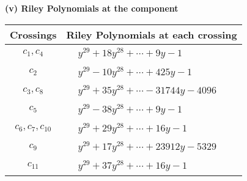 \documentclass[1p]{elsarticle_modified}
\theoremstyle{definition}
\begin{document}
\newpage\renewcommand{\arraystretch}{1}
\flushleft \textbf{(v) Riley Polynomials at the component}\newline \\
\begin{tabular}{m{50pt}|m{274pt}}
Crossings & \hspace{64pt}Riley Polynomials at each crossing \\
\hline $$\begin{aligned}c_{1},c_{4}\end{aligned}$$&$\begin{aligned}
&y^{29}+18 y^{28}+\cdots+9 y-1
\end{aligned}$\\
\hline $$\begin{aligned}c_{2}\end{aligned}$$&$\begin{aligned}
&y^{29}-10 y^{28}+\cdots+425 y-1
\end{aligned}$\\
\hline $$\begin{aligned}c_{3},c_{8}\end{aligned}$$&$\begin{aligned}
&y^{29}+35 y^{28}+\cdots-31744 y-4096
\end{aligned}$\\
\hline $$\begin{aligned}c_{5}\end{aligned}$$&$\begin{aligned}
&y^{29}-38 y^{28}+\cdots+9 y-1
\end{aligned}$\\
\hline $$\begin{aligned}c_{6},c_{7},c_{10}\end{aligned}$$&$\begin{aligned}
&y^{29}+29 y^{28}+\cdots+16 y-1
\end{aligned}$\\
\hline $$\begin{aligned}c_{9}\end{aligned}$$&$\begin{aligned}
&y^{29}+17 y^{28}+\cdots+23912 y-5329
\end{aligned}$\\
\hline $$\begin{aligned}c_{11}\end{aligned}$$&$\begin{aligned}
&y^{29}+37 y^{28}+\cdots+16 y-1
\end{aligned}$\\
\hline
\end{tabular}\\~\\
\end{document}
